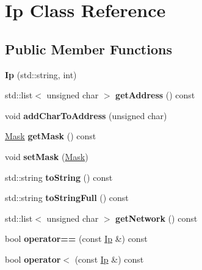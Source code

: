 \hypertarget{class_ip}{\section{Ip Class Reference}
\label{class_ip}
}
\subsection*{Public Member Functions}
\begin{DoxyCompactItemize}
\item 
\hypertarget{class_ip_a317ac24cf9b1f3cda85dea78f4e6d10c}{{\bfseries Ip} (std\-::string, int)}\label{class_ip_a317ac24cf9b1f3cda85dea78f4e6d10c}

\item 
\hypertarget{class_ip_ab2d2f83246faf4a36f3ef27d03d47e07}{std\-::list$<$ unsigned char $>$ {\bfseries get\-Address} () const }\label{class_ip_ab2d2f83246faf4a36f3ef27d03d47e07}

\item 
\hypertarget{class_ip_ac3afd75b2f0aca0848673f8ef9351cf6}{void {\bfseries add\-Char\-To\-Address} (unsigned char)}\label{class_ip_ac3afd75b2f0aca0848673f8ef9351cf6}

\item 
\hypertarget{class_ip_a2c1056d54b14dd5da3a87ddd283b1104}{\hyperlink{class_mask}{Mask} {\bfseries get\-Mask} () const }\label{class_ip_a2c1056d54b14dd5da3a87ddd283b1104}

\item 
\hypertarget{class_ip_a5d8f6e9e5f7ace65d8b2331fa2b537f8}{void {\bfseries set\-Mask} (\hyperlink{class_mask}{Mask})}\label{class_ip_a5d8f6e9e5f7ace65d8b2331fa2b537f8}

\item 
\hypertarget{class_ip_aa8a850bd6c0abb66705abe3faec2f928}{std\-::string {\bfseries to\-String} () const }\label{class_ip_aa8a850bd6c0abb66705abe3faec2f928}

\item 
\hypertarget{class_ip_a26bd66f26e278a09b897a83d06456ff4}{std\-::string {\bfseries to\-String\-Full} () const }\label{class_ip_a26bd66f26e278a09b897a83d06456ff4}

\item 
\hypertarget{class_ip_a2fdea06140f227f24af07bf368247cef}{std\-::list$<$ unsigned char $>$ {\bfseries get\-Network} () const }\label{class_ip_a2fdea06140f227f24af07bf368247cef}

\item 
\hypertarget{class_ip_aec3af20f5a9d046d837b7773f0ffc6b8}{bool {\bfseries operator==} (const \hyperlink{class_ip}{Ip} \&) const }\label{class_ip_aec3af20f5a9d046d837b7773f0ffc6b8}

\item 
\hypertarget{class_ip_a2477e83eaea93b07628d55e661aa18df}{bool {\bfseries operator$<$} (const \hyperlink{class_ip}{Ip} \&) const }\label{class_ip_a2477e83eaea93b07628d55e661aa18df}

\end{DoxyCompactItemize}
